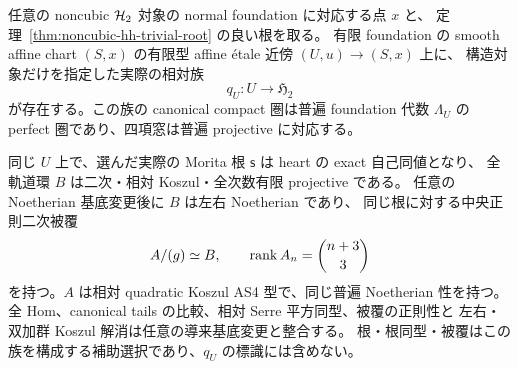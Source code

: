 \begin{theorem}
\label{thm:noncubic-finite-type-effectivity}
任意の noncubic $\mathcal H_2$ 対象の normal foundation に対応する点 $x$ と、
定理~\ref{thm:noncubic-hh-trivial-root} の良い根を取る。
有限 foundation の smooth affine chart $(S,x)$ の有限型 affine
\texorpdfstring{\'etale}{etale} 近傍 $(U,u)\to(S,x)$ 上に、
構造対象だけを指定した実際の相対族
\[
 q_U:U\longrightarrow\mathfrak H_2
\]
が存在する。この族の canonical compact 圏は普遍 foundation 代数
$\Lambda_U$ の perfect 圏であり、四項窓は普遍 projective に対応する。

同じ $U$ 上で、選んだ実際の Morita 根 $\mathsf s$ は heart の exact 自己同値となり、
全軌道環 $B$ は二次・相対 Koszul・全次数有限 projective である。
任意の Noetherian 基底変更後に $B$ は左右 Noetherian であり、
同じ根に対する中央正則二次被覆
\[
 A/(g)\simeq B,
 \qquad \operatorname{rank} A_n=\binom{n+3}{3}
\]
を持つ。$A$ は相対 quadratic Koszul AS4 型で、同じ普遍 Noetherian 性を持つ。
全 Hom、canonical tails の比較、相対 Serre 平方同型、被覆の正則性と
左右・双加群 Koszul 解消は任意の導来基底変更と整合する。
根・根同型・被覆はこの族を構成する補助選択であり、$q_U$ の標識には含めない。
\end{theorem}

